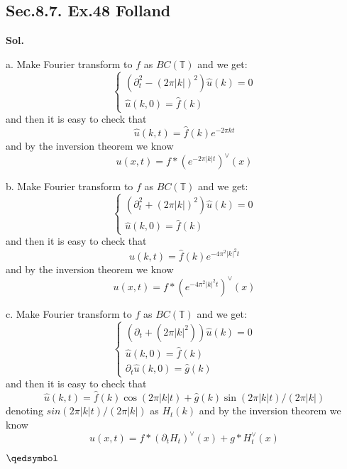 \documentclass[lang=en,11pt,a4paper,citestyle =authoryear]{elegantpaper}
\newcommand{\prvd}{$\hfill \qedsymbol$}
\begin{document}
\subsection*{Sec.8.7. Ex.48 Folland} 
\textbf{Sol.} \par
a. Make  Fourier transform to $f$ as $BC(\mathbb{T})$ and we get:
\[
\begin{cases}
    (\partial^2_t - (2\pi|k|)^2)\hat{u}(k) = 0 \\
    \hat{u}(k,0) = \hat{f}(k)
\end{cases}
\]
and then it is easy to check that
\[
\hat{u}(k,t) = \hat{f}(k)e^{-2\pi kt}
\]
and by the inversion theorem we know
\[
u(x,t) = f * (e^{-2\pi|k|t})^{\vee}(x)
\]\par
b.  Make  Fourier transform to $f$ as $BC(\mathbb{T})$ and we get:
\[
\begin{cases}
    (\partial^2_t + (2\pi|k|)^2)\hat{u}(k) = 0 \\
    \hat{u}(k,0) = \hat{f}(k)
\end{cases}
\]
and then it is easy to check that
\[
\hat{u}(k,t) = \hat{f}(k)e^{-4\pi^2|k|^2t}
\]
and by the inversion theorem we know
\[
u(x,t) = f * (e^{-4\pi^2|k|^2t})^{\vee}(x)
\]\par
c.  Make  Fourier transform to $f$ as $BC(\mathbb{T})$ and we get:
\[
\begin{cases}
    (\partial_t + (2\pi|k|^2))\hat{u}(k) = 0 \\
    \hat{u}(k,0) = \hat{f}(k) \\
    \partial_t \hat{u}(k,0) = \hat{g}(k)
\end{cases}
\]
and then it is easy to check that
\[
\hat{u}(k,t) = \hat{f}(k)\cos(2\pi|k|t)+\hat{g}(k)\sin(2\pi|k|t)/(2\pi|k|)
\]
denoting $sin(2\pi|k|t)/(2\pi|k|)$ as $H_t(k)$ and by the inversion theorem we know
\[
u(x,t) = f * (\partial_t H_t)^{\vee}(x)+g*H_t^{\vee}(x)
\]\par
\prvd
\end{document}
